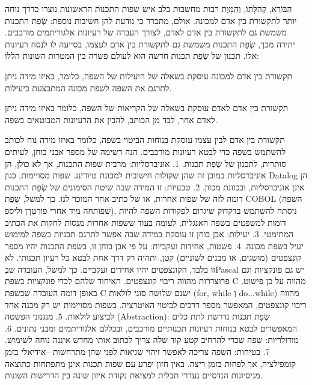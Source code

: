       הַבּוֹרֵא, קְהִלָּתוֹ, וְהַמָּוֶת
      רבות מחשבות בלב איש
      שפות התכנות הראשונות נוצרו כדרך נוחה יותר לתקשורת בין אדם למכונה. אולם, מתברר כי נודעת להן חשיבות נוספת: שְׂפַת התכנות משמשת גם לתקשורת בין אדם לאדם, לצורך העברה של רעיונות אלגוריתמים מורכבים. יתירה מכך, שְׂפַת התכנות משמשת גם לתקשורת בין אדם לעצמו, בסייעה לו לנסח רעיונות אלו.
      תכנון של שְׂפַת תכנות חדשה הוא לעולם פשרה בין המטרות השונות הללו:
      \begin{ציינון}
\item תקשורת בין אדם למכונה עוסקת בשאלה של היעילות של השפה, כלומר, באיזו מידה ניתן לתרגם את השפה לשפת מכונה המתבצעת ביעילות.
\item תקשורת בין אדם לאדם עוסקת בשאלה של הקריאות של השפה, כלומר באיזו מידה ניתן לאדם אחר, לבד מן הכותב, להבין את הרעיונות המבוטאים בשפה.
\item תקשורת בין אדם לבין עצמו עוסקת בנוחות הביטוי בשפה, כלומר באיזו מידה נוח לכותב להשתמש בשפה כדי לבטא רעיונות מורכבים.
      הנה רשימה של מספר אבני בוחן, לעיתים סותרות, לתכנון של שְׂפַת תכנות.
      1. אוניברסליות: מרבית שפות התכנות, אך לא כולן, הן אוניברסליות במובן זה שהן שקולות חישובית למכונת טיורינג. שפות מסויימות, כגון Datalog הן אינן אוניברסליות, ובכוונת מכוון.
      2. טבעיות: זו המידה שבה שיטת הסימונים של שְׂפַת התכנות דומה לזה של שפות אחרות, או של כתיב אחר המוכר לנו. כך למשל, שְׂפַת COBOL (השפה שפותחה מיד אחרי פוֹרְטְרָן וליספ), ניסתה להשתמש בדקדוק שיגרום לפקודות השפה להיות דומות למשפטים בשפה האנגלית, לעומה בעוד ששפות אחרות מנסות לחקות את הכתיב המתימטי.
      3. יעילות: אבן בוחן זו עוסקת במידה שבה אפשר לתרגם תכניות בשפה למימוש יעיל בשפת מכונה.
      4. פשטות, אחידות ועקביות: על פי אבן בוחן זו, בשפת התכנות יהיו מספר קונצפטים (מושגים, או מבנים לשוניים) קטן, ותהיה רק דרך אחת לבטא כל רעיון תכנותי. לא זו בלבד, הקונצפטים יהיו אחידים ועקביים. כך למשל, העובדה שבְּPascal יש גם פונקציות וגם פרוצדרות מהווה ריבוי קונצפטים. האיחוד שלהם לכדי פונקציות בשפת C מהווה על כן פישוט. באופן דומה העובדה שבשפת C ישנם שלושה סוגי לולאות (for, while וְ do...while) מהווה ריבוי קונצפטים, המאפשר מספר דרכים לביטוי האיטרציה. בשפות מסויימות יש רק מבנה אחד לביצוע לולאות.
      5. מנגנוני הפשטה (Abstraction): שְׂפַת תכנות נדרשת לתת כלים המאפשרים לבטא בנוחות רעיונות תכנותיים מורכבים, ובכללם אלגוריתמים ומבני נתונים.
      6. מודולריות: שפה שכדי להרחיב קטע קוד שלה צריך לכתוב אותו מחדש איננה נוחה לשימוש.
      7. בטיחות: השפה צריכה לאפשר זיהוי שגיאות לפני שהן מתרחשות –אידיאלי בזמן קומפילציה, אך לפחות בזמן ריצה.
      באין חזון יפרע עם
      שפות תכנות אינן מתפתחות כתוצאה מניסיונות הנדסיים נעדרי תכלית למציאת נקודת איזון שונה בין הדרישות השונות.

\end{ציינון}
